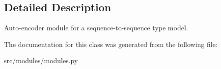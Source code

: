 \subsection{Detailed Description}
\begin{DoxyVerb}Auto-encoder module for a sequence-to-sequence type model.
\end{DoxyVerb}
 

The documentation for this class was generated from the following file\+:\begin{DoxyCompactItemize}
\item 
src/modules/modules.\+py\end{DoxyCompactItemize}
